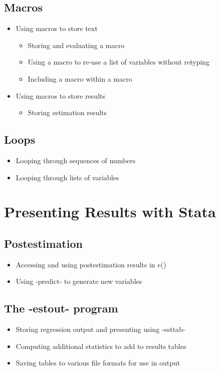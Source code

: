 \documentclass{scrartcl}
\begin{document}
\subsection{Macros}
\begin{itemize}
  \item Using macros to store text
  \begin{itemize}
    \item Storing and evaluating a macro
    \item Using a macro to re-use a list of variables without retyping
    \item Including a macro within a macro
  \end{itemize}
  \item Using macros to store results
  \begin{itemize}
    \item Storing estimation results
  \end{itemize}
\end{itemize}

\subsection{Loops}
\begin{itemize}
  \item Looping through sequences of numbers
  \item Looping through lists of variables
\end{itemize}

\section{Presenting Results with Stata}

\subsection{Postestimation}
\begin{itemize}
  \item Accessing and using postestimation results in e()
  \item Using -predict- to generate new variables
\end{itemize}

\subsection{The -estout- program}
\begin{itemize}
  \item Storing regression output and presenting using -esttab-
  \item Computing additional statistics to add to results tables
  \item Saving tables to various file formats for use in output
\end{itemize}
\end{document}
